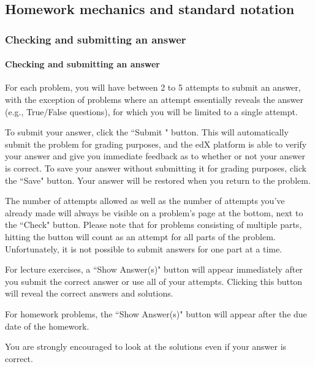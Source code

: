 \documentclass[pdftex, brazil, 12pt, twoside]{article}
\begin{document}
\subsection{Homework mechanics and standard notation}
\label{ovw0-hw}

\subsubsection{Checking and submitting an answer}
\label{ovw0-hw-checking}

\paragraph{Checking and submitting an answer} For each problem, you will have between
2 to 5 attempts to submit an answer, with the exception of problems where an attempt
essentially reveals the answer (e.g., True/False questions), for which you will be
limited to a single attempt.

To submit your answer, click the “Submit " button. This will automatically submit
the problem for grading purposes, and the edX platform is able to verify your answer
and give you immediate feedback as to whether or not your answer is correct. To save
your answer without submitting it for grading purposes, click the “Save" button.
Your answer will be restored when you return to the problem.

The number of attempts allowed as well as the number of attempts you've already made
will always be visible on a problem's page at the bottom, next to the “Check" button.
Please note that for problems consisting of multiple parts, hitting the button will count
as an attempt for all parts of the problem. Unfortunately, it is not possible to submit
answers for one part at a time.

For lecture exercises, a “Show Answer(s)" button will appear immediately after you
submit the correct answer or use all of your attempts. Clicking this button will
reveal the correct answers and solutions.

For homework problems, the “Show Answer(s)" button will appear after the due date
of the homework.

You are strongly encouraged to look at the solutions even if your answer is correct.
\end{document}
